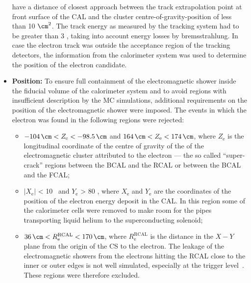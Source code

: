 \begin{itemize}
	have a distance of closest approach between the track extrapolation point at front surface of the CAL and the cluster centre-of-gravity-position of less than 10 $\cm^2$. The track energy as measured by the tracking system had to be greater than 3 \GeV, taking into account energy losses by bremsstrahlung. In case the electron track was outside the acceptance region of the tracking detectors, the information from the calorimeter system was used to determine the position of the electron candidate.
	\item \textbf{Position:} To ensure full containment of the electromagnetic shower inside the fiducial volume of the calorimeter system and to avoid regions with insufficient description by the MC simulations, additional requirements on the position of the electromagnetic shower were imposed. The events in which the electron was found in the following regions were rejected:
	\begin{itemize}
		\item $ -104\, \cm < Z_\text{e} < -98.5\, \cm	$ and $ 164\, \cm < Z_\text{e} < 174\, \cm $, where $Z_\text{e}$ is the longitudinal coordinate of the centre of gravity of the of the electromagnetic cluster attributed to the electron --- the so called ``super-crack'' regions between the BCAL and the RCAL or between the BCAL and the FCAL;
		\item $\left| X_\text{e} \right|$ < 10 \cm\, and $Y_\text{e}$ > 80 \cm, where $X_\text{e}$ and $Y_\text{e}$ are the coordinates of the position of the electron energy deposit in the CAL. In this region some of the calorimeter cells were removed to make room for the  pipes transporting  liquid helium to the superconducting solenoid;
		\item $ 36\, \cm < R^\text{RCAL}_\text{e} < 170\, \cm $, where $R^\text{RCAL}_\text{e}$ is the distance in the $X-Y$ plane from the origin of the \zeus CS to the electron. The leakage of the electromagnetic showers from the electrons hitting the RCAL close to the inner or outer edges is not well simulated, especially at the trigger level~\cite{thesis:januschek:2011}. These regions were therefore excluded. 
	\end{itemize}
\end{itemize}

